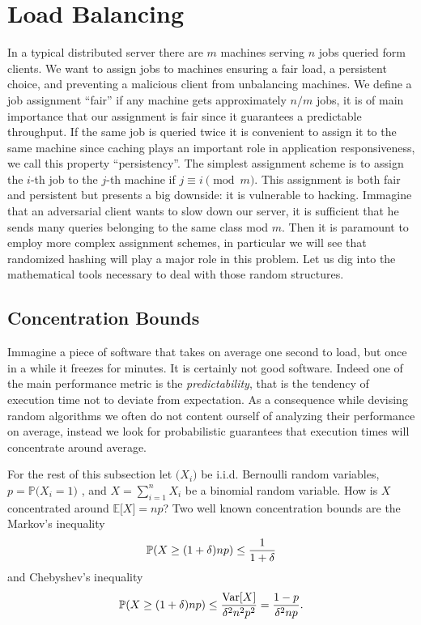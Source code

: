 \section{Load Balancing}

In a typical distributed server there are $m$ machines serving $n$ jobs
queried form clients. We want to assign jobs
to machines ensuring a fair load, a persistent choice, and preventing a
malicious client from unbalancing machines.
We define a job assignment ``fair'' if any machine gets approximately
$n / m$ jobs, it is of main importance that our assignment is fair since
it guarantees a predictable throughput.
If the same job is queried twice it is convenient to assign
it to the same machine since caching plays an important role in application
responsiveness, we call this property ``persistency''.  
The simplest assignment scheme is to assign the $i$-th job to the
$j$-th machine if $j \equiv i \pmod m$. This assignment is both fair and
persistent but presents a big downside: it is vulnerable to hacking. Immagine
that an adversarial client wants to slow down our server, it is sufficient
that he sends many queries belonging to the same class mod $m$. Then it is
paramount to employ more complex assignment schemes, in particular we will see
that randomized hashing will play a major role in this problem. Let us dig into
the mathematical tools necessary to deal with those random structures.

\subsection{Concentration Bounds}
Immagine a piece of
software that takes on average one second to load, but once in a while it
freezes for minutes. It is certainly not good software. Indeed one of the main
performance metric is the \textit{predictability}, that is the tendency
of execution
time not to deviate from expectation. As a consequence while devising
random algorithms we often do not content ourself of analyzing their
performance on average, instead we look for probabilistic guarantees
that execution times will concentrate around average.

For the rest of this subsection let $\bigl(X_i\bigr)$ be i.i.d. Bernoulli random
variables, $p = \mathbb{P}\bigl(X_i = 1\bigr)$ , and $X = \sum_{i=1}^n X_i$ be a binomial
random variable. How is $X$ concentrated around $\mathbb{E}\bigl[X\bigr] = n p$?
Two well known concentration bounds are the Markov's inequality
\begin{equation*}
\operatorname{\mathbb{P}}(X \geq (1 + \delta)np) \leq \frac{1}{1 + \delta}
\end{equation*}
and Chebyshev's inequality
\begin{equation*}
\operatorname{\mathbb{P}}(X \geq (1 + \delta)np) \leq \frac{\mathrm{Var}[X]}{\delta^2 n^2 p^2} = \frac{1 - p}{\delta^2 n p}.
\end{equation*}

